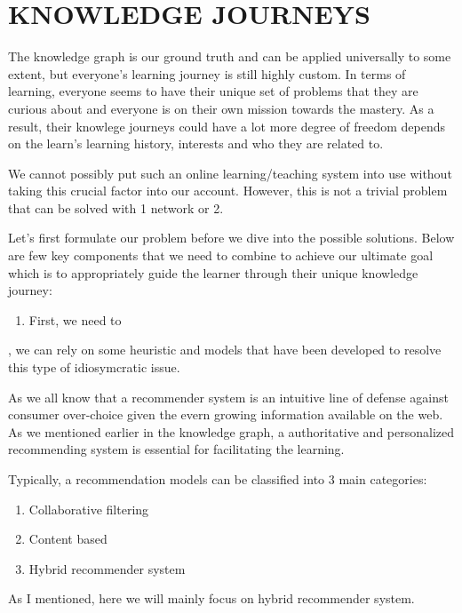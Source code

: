 \documentclass[]{book}
\providecommand{\tightlist}{%
  \setlength{\itemsep}{0pt}\setlength{\parskip}{0pt}}
\theoremstyle{definition}
\theoremstyle{definition}
\theoremstyle{definition}
\theoremstyle{remark}
\begin{document}
\section{KNOWLEDGE JOURNEYS}\label{knowledge-journeys-1}

The knowledge graph is our ground truth and can be applied universally
to some extent, but everyone's learning journey is still highly custom.
In terms of learning, everyone seems to have their unique set of
problems that they are curious about and everyone is on their own
mission towards the mastery. As a result, their knowlege journeys could
have a lot more degree of freedom depends on the learn's learning
history, interests and who they are related to.

We cannot possibly put such an online learning/teaching system into use
without taking this crucial factor into our account. However, this is
not a trivial problem that can be solved with 1 network or 2.

Let's first formulate our problem before we dive into the possible
solutions. Below are few key components that we need to combine to
achieve our ultimate goal which is to appropriately guide the learner
through their unique knowledge journey:

\begin{enumerate}
\def\labelenumi{\arabic{enumi}.}
\tightlist
\item
  First, we need to
\end{enumerate}

, we can rely on some heuristic and models that have been developed to
resolve this type of idiosymcratic issue.

As we all know that a recommender system is an intuitive line of defense
against consumer over-choice given the evern growing information
available on the web. As we mentioned earlier in the knowledge graph, a
authoritative and personalized recommending system is essential for
facilitating the learning.

Typically, a recommendation models can be classified into 3 main
categories:

\begin{enumerate}
\def\labelenumi{\arabic{enumi}.}
\item
  Collaborative filtering
\item
  Content based
\item
  Hybrid recommender system
\end{enumerate}

As I mentioned, here we will mainly focus on hybrid recommender system.
\end{document}

